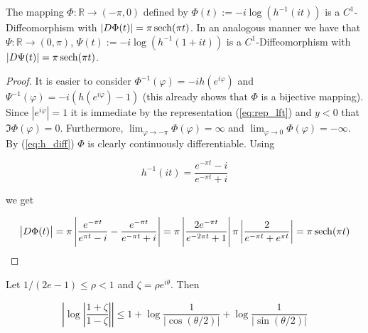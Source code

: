 \begin{lemma}
	The mapping $\Phi: \mathbb{R} \rightarrow (-\pi,0)$ defined by $\Phi(t) := -i\log\left( h^{-1}(it) \right)$ is a $C^1$-Diffeomorphism with $\vert D\Phi(t)\vert = \pi \operatorname{sech}(\pi t)$. In an analogous manner we have that $\Psi: \mathbb{R} \rightarrow (0,\pi)$, $\Psi(t) := -i\log\left( h^{-1}(1 + it) \right)$ is a $C^1$-Diffeomorphism with $\vert D\Psi(t)\vert = \pi \operatorname{sech}(\pi t)$.
	\label{lem:change_of_variables}
\end{lemma}

\begin{proof}
	It is easier to consider $\Phi^{-1}(\varphi) = -i h(e^{i\varphi})$ and $\Psi^{-1}(\varphi) = -i\left( h(e^{i\varphi}) - 1 \right)$ (this already shows that $\Phi$ is a bijective mapping). Since $\left| e^{i\varphi}\right| = 1$ it is immediate by the representation (\ref{eq:rep_lft}) and $y < 0$ that $\Im \Phi(\varphi) = 0$. Furthermore, $\lim_{\varphi \rightarrow -\pi} \Phi(\varphi) = \infty$ and $\lim_{\varphi \rightarrow 0} \Phi(\varphi) = -\infty$. By (\ref{eq:h_diff}) $\Phi$ is clearly continuously differentiable. Using
	
	\begin{equation*}
		h^{-1}(it) = \frac{e^{-\pi t} - i}{e^{-\pi t} + i}
	\end{equation*}
	
	we get

	\begin{gather*}
		\left| D\Phi(t)\right| = \pi\left| \frac{e^{-\pi t}}{e^{\pi t} - i} - \frac{e^{-\pi t}}{e^{-\pi t} + i}\right| = \pi\left| \frac{2e^{-\pi t}}{e^{-2\pi t} + 1}\right| \pi \left| \frac{2}{e^{-\pi t} + e^{\pi t}}\right|= \pi \operatorname{sech}(\pi t)
	\end{gather*}
\end{proof}

\begin{lemma}
	Let $1/(2e - 1) \leq \rho < 1$ and $\zeta = \rho e^{i\theta}$. Then

	\begin{equation*}
		\left| \log \left| \frac{1 + \zeta}{1 - \zeta} \right| \right| \leq 1 + \log \frac{1}{\left| \cos(\theta/2) \right|} + \log \frac{1}{\left| \sin(\theta/2) \right|}
	\end{equation*}
	\label{lem:upper_bound}
\end{lemma}

